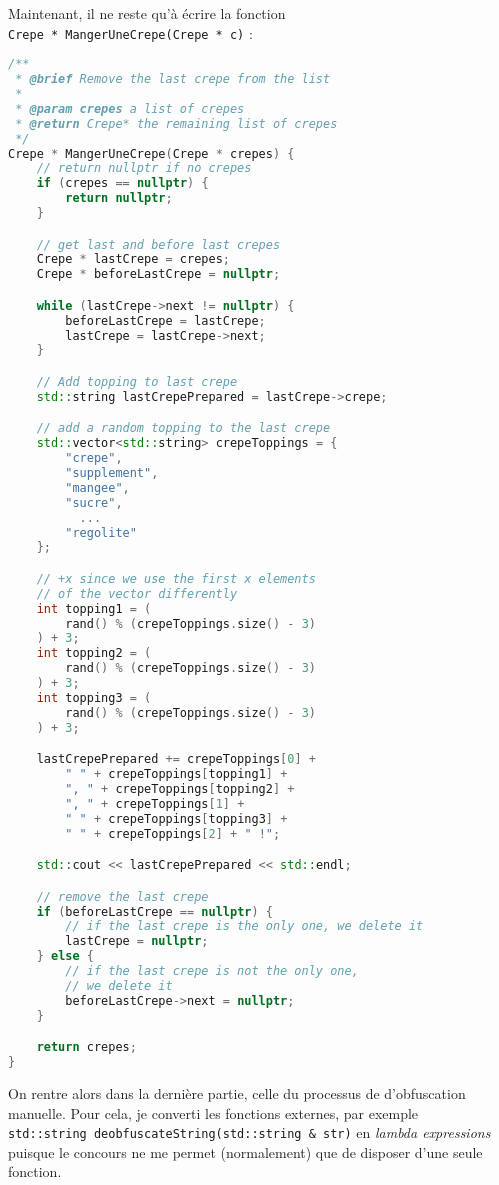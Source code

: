 \documentclass[12pt]{article} %
\begin{document}
Maintenant, il ne reste qu'à écrire la fonction \\ \verb|Crepe * MangerUneCrepe(Crepe * c)| :
\begin{lstlisting}[language=C++]
/**
 * @brief Remove the last crepe from the list
 * 
 * @param crepes a list of crepes
 * @return Crepe* the remaining list of crepes
 */
Crepe * MangerUneCrepe(Crepe * crepes) {
    // return nullptr if no crepes
    if (crepes == nullptr) {
        return nullptr;
    }

    // get last and before last crepes
    Crepe * lastCrepe = crepes;
    Crepe * beforeLastCrepe = nullptr;

    while (lastCrepe->next != nullptr) {
        beforeLastCrepe = lastCrepe;
        lastCrepe = lastCrepe->next;
    }

    // Add topping to last crepe
    std::string lastCrepePrepared = lastCrepe->crepe;

    // add a random topping to the last crepe
    std::vector<std::string> crepeToppings = {
        "crepe",
        "supplement",
        "mangee",
        "sucre",
          ...
        "regolite"
    };

    // +x since we use the first x elements
    // of the vector differently
    int topping1 = (
        rand() % (crepeToppings.size() - 3)
    ) + 3; 
    int topping2 = (
        rand() % (crepeToppings.size() - 3)
    ) + 3;
    int topping3 = (
        rand() % (crepeToppings.size() - 3)
    ) + 3;

    lastCrepePrepared += crepeToppings[0] + 
        " " + crepeToppings[topping1] + 
        ", " + crepeToppings[topping2] + 
        ", " + crepeToppings[1] + 
        " " + crepeToppings[topping3] +
        " " + crepeToppings[2] + " !";

    std::cout << lastCrepePrepared << std::endl;

    // remove the last crepe
    if (beforeLastCrepe == nullptr) {
        // if the last crepe is the only one, we delete it
        lastCrepe = nullptr;
    } else {
        // if the last crepe is not the only one, 
        // we delete it
        beforeLastCrepe->next = nullptr;
    }

    return crepes;
}
\end{lstlisting}

On rentre alors dans la dernière partie, celle du processus de d'obfuscation manuelle. Pour cela, je converti les fonctions externes, par exemple \\ \verb|std::string deobfuscateString(std::string & str)| en \textit{lambda expressions} puisque le concours ne me permet (normalement) que de disposer d'une seule fonction.
\end{document}
